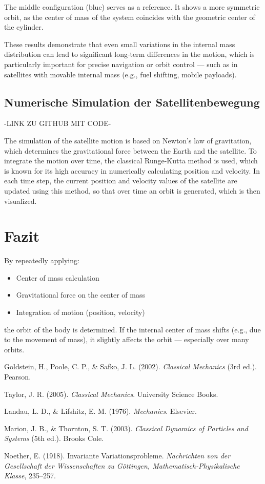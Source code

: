 \documentclass[conference]{IEEEtran}
\begin{document}
The middle configuration (blue) serves as a reference. It shows a more symmetric orbit, as the center of mass of the system coincides with the geometric center of the cylinder.

These results demonstrate that even small variations in the internal mass distribution can lead to significant long-term differences in the motion, which is particularly important for precise navigation or orbit control — such as in satellites with movable internal mass (e.g., fuel shifting, mobile payloads).


\subsection{Numerische Simulation der Satellitenbewegung}
-LINK ZU GITHUB MIT CODE-

The simulation of the satellite motion is based on Newton's law of gravitation, which determines the gravitational force between the Earth and the satellite. To integrate the motion over time, the classical Runge-Kutta method is used, which is known for its high accuracy in numerically calculating position and velocity. In each time step, the current position and velocity values of the satellite are updated using this method, so that over time an orbit is generated, which is then visualized.


\section{Fazit}

By repeatedly applying:
\begin{itemize}
  \item Center of mass calculation
  \item Gravitational force on the center of mass
  \item Integration of motion (position, velocity)
\end{itemize}
the orbit of the body is determined. If the internal center of mass shifts (e.g., due to the movement of mass), it slightly affects the orbit — especially over many orbits.

\begin{thebibliography}{9}

Goldstein, H., Poole, C. P., \& Safko, J. L. (2002). \textit{Classical Mechanics} (3rd ed.). Pearson.

Taylor, J. R. (2005). \textit{Classical Mechanics}. University Science Books.

Landau, L. D., \& Lifshitz, E. M. (1976). \textit{Mechanics}. Elsevier.

Marion, J. B., \& Thornton, S. T. (2003). \textit{Classical Dynamics of Particles and Systems} (5th ed.). Brooks Cole.

Noether, E. (1918). Invariante Variationsprobleme. \textit{Nachrichten von der Gesellschaft der Wissenschaften zu Göttingen, Mathematisch-Physikalische Klasse}, 235--257.

\end{thebibliography}
\end{document}
